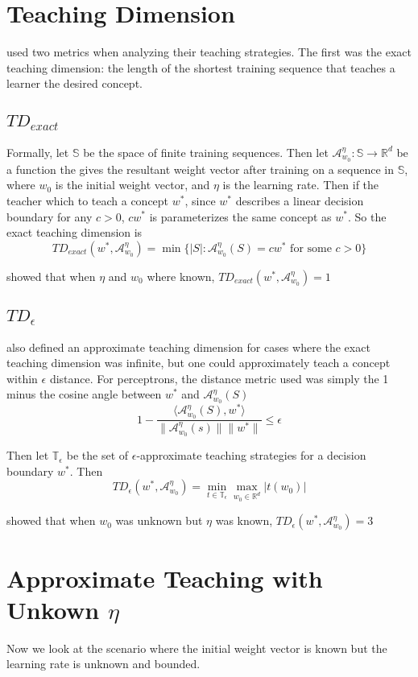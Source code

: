 \documentclass{article}
\newcommand{\learn}{\mathcal{A}_{w_0}^\eta}
\begin{document}
\section{Teaching Dimension}
\cite{perceptron} used two metrics when analyzing their teaching strategies. The first was the exact 
teaching dimension: the length of the shortest training sequence that teaches a learner the desired concept. 

\subsection{$TD_{exact}$}

Formally, let $\mathbb{S}$ be the space of finite training 
sequences. Then let $\mathcal{A}_{w_0}^{\eta} : \mathbb{S} \to \mathbb{R}^d$ be a function the gives the 
resultant weight vector after training on a sequence in $\mathbb{S}$, where $w_0$ is the initial weight 
vector, and $\eta$ is the learning rate. Then if the teacher which to teach a
concept $w^*$, since $w^*$ describes a linear decision boundary for any $c > 0$,
$cw^*$ is parameterizes the same concept as $w^*$. So the exact teaching dimension is 
$$
TD_{exact}(w^*, \mathcal{A}_{w_0}^\eta) = \min\{ \lvert S \rvert : 
\mathcal{A}_{w_0}^\eta(S) = cw^* \text{ for some } c >0 \}
$$

\cite{perceptron} showed that when $\eta$ and $w_0$ where known, $TD_{exact}(w^*, \mathcal{A}_{w_0}^\eta) = 1$

\subsection{$TD_\epsilon$}
\cite{perceptron} also defined an approximate teaching dimension for cases where
the exact teaching dimension was infinite, but one could approximately teach a concept within $\epsilon$ distance. For perceptrons, the distance metric used was simply the 1 minus the cosine angle between $w^*$ and $\learn(S)$
$$
1 -\frac{\langle \learn(S), w^* \rangle}{\lVert \learn(s) \rVert \lVert w^* \rVert} \leq \epsilon
$$

Then let $\mathbb{T}_\epsilon$ be the set of $\epsilon$-approximate teaching strategies for a decision boundary $w^*$. Then
$$
TD_\epsilon(w^*, \learn) = \min_{t \in 
\mathbb{T}_\epsilon} \max_{w_0 \in 
\mathbb{R}^d} \lvert t(w_0) \rvert
$$

\cite{perceptron} showed that when $w_0$ was unknown but $\eta$ was known, $TD_\epsilon(w^*, \learn) = 3$

\section{Approximate Teaching with Unkown $\eta$}
Now we look at the scenario where the initial weight vector is known but the learning rate is unknown and bounded.
\end{document}
